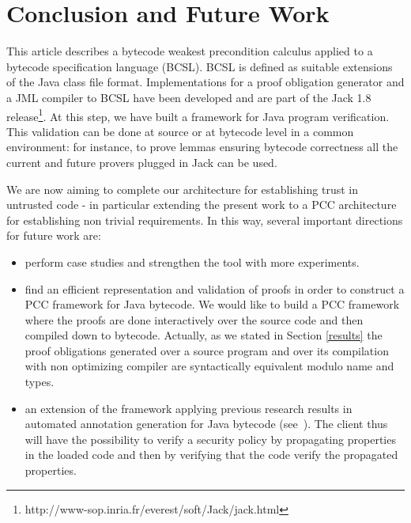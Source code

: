 \section{Conclusion and Future Work}\label{conclusion}
This article describes a bytecode weakest precondition calculus applied to a bytecode specification language (BCSL).
BCSL is defined as suitable extensions of the Java class file format.
Implementations for a proof obligation generator and a JML compiler to BCSL have been developed and are part of the Jack 1.8 release\footnote{http://www-sop.inria.fr/everest/soft/Jack/jack.html}.
At this step, we have built a framework for Java program verification.
 This validation can be done at source or at bytecode level in a common environment: for instance, to prove lemmas ensuring bytecode correctness all the current and future provers plugged in Jack can be used.

We are now aiming to complete our architecture for establishing trust in untrusted code - in particular extending the present work to a PCC architecture for establishing non trivial requirements.  
In this way, several important directions for future work are:
\begin{itemize}
\item perform case studies and strengthen the tool with more experiments.
\item find an efficient representation and validation of proofs in order to construct a PCC framework for Java bytecode. We would like to build a PCC framework where the proofs are done interactively over the source code
and then compiled down to bytecode. Actually, as we stated in Section \ref{results} the proof obligations generated over a source program and over its compilation with non optimizing compiler are syntactically equivalent modulo name and types. 
\item an extension of the framework applying previous research results in automated annotation generation for Java bytecode (see~\cite{PBBHL}). The client thus will have the possibility to verify a security policy by propagating properties in the loaded code and then by verifying that the code verify the propagated properties.

\end{itemize}

